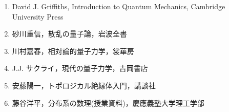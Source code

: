 \documentclass{report}
\begin{document}
  \begin{enumerate}
    \item David J. Griffiths, Introduction to Quantum Mechanics, Cambridge University Press
    \item 砂川重信，散乱の量子論，岩波全書
    \item 川村嘉春，相対論的量子力学，裳華房
    \item J.J. サクライ，現代の量子力学，吉岡書店
    \item 安藤陽一，トポロジカル絶縁体入門，講談社
    \item 藤谷洋平，分布系の数理(授業資料)，慶應義塾大学理工学部
  \end{enumerate}
\end{document}
